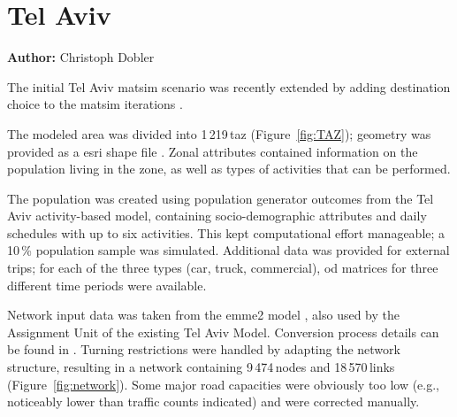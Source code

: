 \section{Tel Aviv}
\label{sec:telaviv}
\hfill \textbf{Author:} Christoph Dobler


The initial Tel Aviv \gls{matsim} scenario \citep[][]{BekhorEtAl_TRB_2011} was recently extended by adding destination choice to the \gls{matsim} iterations \citep[][]{DoblerEtAl_TechRep_IVT_2014}.

The modeled area was divided into 1\,219\,\gls{taz} (Figure~\ref{fig:TAZ}); geometry was provided as a \gls{esri} shape file \citep{ESRI-ShapeFile_manual_1998}. Zonal attributes contained information on the population living in the zone, as well as types of activities that can be performed.

The population was created using population generator outcomes from the Tel Aviv activity-based model, containing socio-demographic attributes and daily schedules with up to six activities. This kept computational effort manageable; a 10\,\% population sample was simulated. Additional data was provided for external trips; for each of the three types (car, truck, commercial), \gls{od} matrices for three different time periods were available.

Network input data was taken from the \gls{emme2} model \citep[see][]{EMME_Webpage_2011}, also used by the Assignment Unit of the existing Tel Aviv Model. Conversion process details can be found in \citet{GaoWEtAl_TRR_2010}. Turning restrictions were handled by adapting the network structure, resulting in a network containing 9\,474\,nodes and 18\,570\,links (Figure~\ref{fig:network}). Some major road capacities were obviously too low (e.g., noticeably lower than traffic counts indicated) and were corrected manually.

